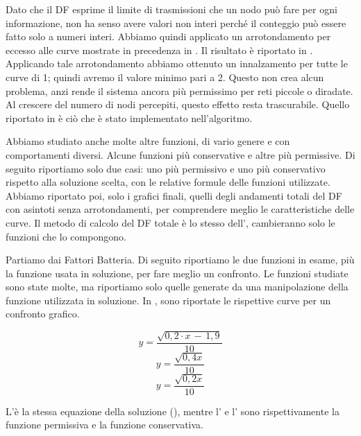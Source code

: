 Dato che il DF esprime il limite di trasmissioni che un nodo può fare per ogni informazione, non ha senso avere valori non interi perché il conteggio può essere fatto solo a numeri interi. Abbiamo quindi applicato un arrotondamento per eccesso alle curve mostrate in precedenza in . Il risultato è riportato in . Applicando tale arrotondamento abbiamo ottenuto un innalzamento per tutte le curve di 1; quindi avremo il valore minimo pari a 2. Questo non crea alcun problema, anzi rende il sistema ancora più permissimo per reti piccole o diradate. Al crescere del numero di nodi percepiti, questo effetto resta trascurabile. Quello riportato in  è ciò che è stato implementato nell'algoritmo.

Abbiamo studiato anche molte altre funzioni, di vario genere e con comportamenti diversi. Alcune funzioni più conservative e altre più permissive. Di seguito riportiamo solo due casi: uno più permissivo e uno più conservativo rispetto alla soluzione scelta, con le relative formule delle funzioni utilizzate. Abbiamo riportato poi, solo i grafici finali, quelli degli andamenti totali del DF con asintoti senza arrotondamenti, per comprendere meglio le caratteristiche delle curve. Il metodo di calcolo del DF totale è lo stesso dell',  cambieranno solo le funzioni che lo compongono.

Partiamo dai Fattori Batteria. Di seguito riportiamo le due funzioni in esame, più la funzione usata in soluzione, per fare meglio un confronto. Le funzioni studiate sono state molte, ma riportiamo solo quelle generate da una manipolazione della funzione utilizzata in soluzione. In , sono riportate le rispettive curve per un confronto grafico.

\begin{equation}
	\label{eq:df_bis_bat_sol}
	y=\dfrac{\sqrt{0,2\cdot x\,-\,1,9}}{10}
\end{equation}
\begin{equation}
	\label{eq:df_bis_bat_perm}
	y=\dfrac{\sqrt{0,4x}}{10}
\end{equation}
\begin{equation}
	\label{eq:df_bis_bat_cons}
	y=\dfrac{\sqrt{0,2x}}{10}
\end{equation}

L'è la stessa equazione della soluzione (), mentre l' e l' sono rispettivamente la funzione permissiva e la funzione conservativa.
\bigskip


